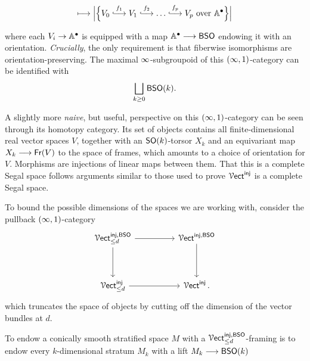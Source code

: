 \begin{construction}
\smallskip

\begin{equation}
    [p] \longmapsto \Big| \Big\{V_0 \xlonghookra{f_1} V_1 \xlonghookra{f_2}\ldots \xlonghookra{f_p} V_p \text{ over } \AA^{\bullet} \Big\} \Big|
\end{equation}
\smallskip

\nid where each $V_{i} \rightarrow \mathbb A^{\bullet}$ is equipped with a map $\mathbb A^{\bullet} \longrightarrow \mathsf B\mathsf S\mathsf O$ endowing it with an orientation. \emph{Crucially}, the only requirement is that fiberwise isomorphisms are orientation-preserving. The maximal $\operatorname{\infty}$-subgroupoid of this $(\operatorname{\infty},1)$-category can be identified with  
\begin{equation}
    \bigsqcup_{k \geq 0} \mathsf B\mathsf S\mathsf O(k).
\end{equation}


\medskip

\nid A slightly more \emph{naive}, but useful, perspective on this $(\operatorname{\infty},1)$-category can be seen through its homotopy category. Its set of objects contains all finite-dimensional real vector spaces $V$, together with an $\mathsf S\mathsf O(k)$-torsor $X_k$ and an equivariant map $X_k \longrightarrow \mathsf{Fr}(V)$ to the space of frames, which amounts to a choice of orientation for $V$. Morphisms are injections of linear maps between them. That this is a complete Segal space follows arguments similar to those used to prove $\operatorname{\mathcal V{\sf ect}}^{\operatorname{\mathsf{inj}}}$ is a complete Segal space.

\medskip

To bound the possible dimensions of the spaces we are working with, consider the pullback $(\operatorname{\infty},1)$-category
\begin{equation}
    \begin{tikzcd}[ampersand replacement=\&]
        {\Vect^{\inj,\BSO}_{\leq d}} \&\& {\Vect^{\inj,\BSO}} \\
        \\
        {\Vect^{\inj}_{\leq d}} \&\& {\Vect^{\inj}} \, .
        \arrow[from=1-1, to=1-3]
        \arrow[from=1-1, to=3-1]
        \arrow[from=1-3, to=3-3]
        \arrow[from=3-1, to=3-3]
    \end{tikzcd}
\end{equation}
which truncates the space of objects by cutting off the dimension of the vector bundles at $d$.

\nid To endow a conically smooth stratified space $M$ with a $\operatorname{\mathcal V{\sf ect}}^{\operatorname{\mathsf{inj}}, \mathsf B\mathsf S\mathsf O}_{\leq d}$-framing is to endow every $k$-dimensional stratum $M_k$ with a lift $M_k \longrightarrow \mathsf B\mathsf S\mathsf O(k)$ 


\end{construction}
